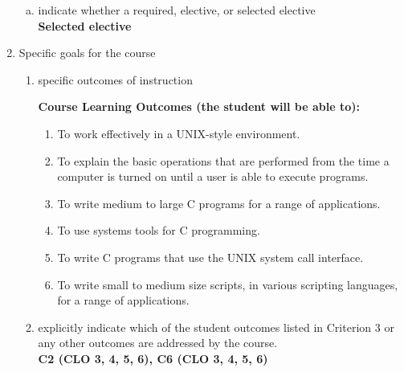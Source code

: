 \begin{enumerate}[1.]
\begin{enumerate}[a.]
\item indicate whether a required, elective, or selected elective\\ %
  {\bfseries
    Selected elective
  }

\end{enumerate}

\item Specific goals for the course
\begin{enumerate}
\item specific outcomes of instruction\\ %
  {\bfseries
    Course Learning Outcomes (the student will be able to):
\begin{enumerate}[1.]
\item To work effectively in a UNIX-style environment.
\item To explain the basic operations that are performed from the time a computer is turned on until a user is able to execute programs.
\item To write medium to large C programs for a range of applications.
\item To use systems tools for C programming.
\item To write C programs that use the UNIX system call interface.
\item To write small to medium size scripts, in various scripting languages, for a range of applications. 
\end{enumerate}
  }

\item explicitly indicate which of the student outcomes listed in Criterion 3 or any other outcomes are addressed by the course.\\
  {\bfseries
    C2 (CLO 3, 4, 5, 6),
    C6 (CLO 3, 4, 5, 6)
  }
\end{enumerate}


\end{enumerate}
